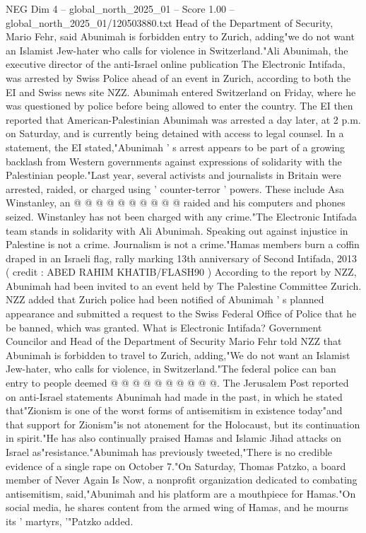 \begin{textsample}{NEG Dim 4 – global\_north\_2025\_01 – Score 1.00 – global\_north\_2025\_01/120503880.txt}  \label{ex:f4_neg_413}
Head of the Department of Security, Mario Fehr, said Abunimah is forbidden entry to Zurich, adding"we do not want an Islamist Jew-hater who calls for violence in Switzerland."Ali Abunimah, the executive director of the anti-Israel online publication The Electronic Intifada, was arrested by Swiss Police ahead of an event in Zurich, according to both the EI and Swiss news site NZZ.
Abunimah entered Switzerland on Friday, where he was questioned by police before being allowed to enter the country.
The EI then reported that American-Palestinian Abunimah was arrested a day later, at 2 p.m. on Saturday, and is currently being detained with access to legal counsel.
In a statement, the EI stated,"Abunimah ' s arrest appears to be part of a growing backlash from Western governments against expressions of solidarity with the Palestinian people."Last year, several activists and journalists in Britain were arrested, raided, or charged using ' counter-terror ' powers.
These include Asa Winstanley, an @ @ @ @ @ @ @ @ @ @ raided and his computers and phones seized.
Winstanley has not been charged with any crime."The Electronic Intifada team stands in solidarity with Ali Abunimah.
Speaking out against injustice in Palestine is not a crime.
Journalism is not a crime."Hamas members burn a coffin draped in an Israeli flag, rally marking 13th anniversary of Second Intifada, 2013 ( credit : ABED RAHIM KHATIB/FLASH90 ) According to the report by NZZ, Abunimah had been invited to an event held by The Palestine Committee Zurich.
NZZ added that Zurich police had been notified of Abunimah ' s planned appearance and submitted a request to the Swiss Federal Office of Police that he be banned, which was granted.
What is Electronic Intifada?
Government Councilor and Head of the Department of Security Mario Fehr told NZZ that Abunimah is forbidden to travel to Zurich, adding,"We do not want an Islamist Jew-hater, who calls for violence, in Switzerland."The federal police can ban entry to people deemed @ @ @ @ @ @ @ @ @ @.
The Jerusalem Post reported on anti-Israel statements Abunimah had made in the past, in which he stated that"Zionism is one of the worst forms of antisemitism in existence today"and that support for Zionism"is not atonement for the Holocaust, but its continuation in spirit."He has also continually praised Hamas and Islamic Jihad attacks on Israel as"resistance."Abunimah has previously tweeted,"There is no credible evidence of a single rape on October 7."On Saturday, Thomas Patzko, a board member of Never Again Is Now, a nonprofit organization dedicated to combating antisemitism, said,"Abunimah and his platform are a mouthpiece for Hamas."On social media, he shares content from the armed wing of Hamas, and he mourns its ' martyrs, '"Patzko added.

\end{textsample}
